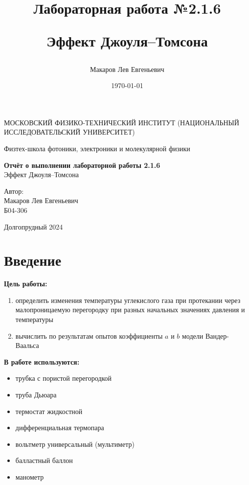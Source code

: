\documentclass[a4paper,12pt]{article}
\author{Макаров Лев Евгеньевич}
\title{Лабораторная работа №2.1.6

Эффект Джоуля–Томсона
}
\date{\today}
\begin{document}
\begin{titlepage}
	\begin{center}
		{\large МОСКОВСКИЙ ФИЗИКО-ТЕХНИЧЕСКИЙ ИНСТИТУТ (НАЦИОНАЛЬНЫЙ ИССЛЕДОВАТЕЛЬСКИЙ УНИВЕРСИТЕТ)}
	\end{center}
	\begin{center}
		{\large Физтех-школа фотоники, электроники и молекулярной физики}
	\end{center}
	
	
	\vspace{4.5cm}
	{\huge
		\begin{center}
			{\bf Отчёт о выполнении лабораторной работы 2.1.6}\\
			Эффект Джоуля–Томсона
		\end{center}
	}
	\vspace{2cm}
	\begin{flushright}
		{\LARGE Автор:\\ Макаров Лев Евгеньевич \\
			\vspace{0.2cm}
			Б04-306}
	\end{flushright}
	\vspace{8cm}
	\begin{center}
		Долгопрудный 2024
	\end{center}
\end{titlepage}

\section{Введение}

\textbf{Цель работы:} 
\begin{enumerate}
	\item определить изменения температуры углекислого газа при протекании через малопроницаемую перегородку при разных начальных значениях давления и температуры
    \item вычислить по результатам опытов коэффициенты $a$ и $b$ модели Вандер-Ваальса
\end{enumerate}

\textbf{В работе используются:} 
\begin{itemize}
    \item трубка с пористой перегородкой
    \item труба Дьюара
    \item термостат жидкостной
    \item дифференциальная термопара
    \item вольтметр универсальный (мультиметр)
    \item балластный баллон
    \item манометр
\end{itemize}
\medskip
\end{document}
